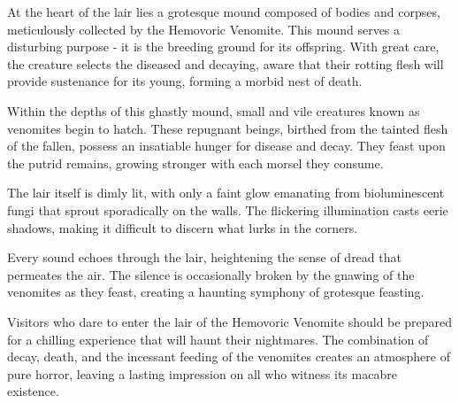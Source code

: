 At the heart of the lair lies a grotesque mound composed of bodies and corpses, meticulously collected by the Hemovoric Venomite. This mound serves a disturbing purpose - it is the breeding ground for its offspring. With great care, the creature selects the diseased and decaying, aware that their rotting flesh will provide sustenance for its young, forming a morbid nest of death.

Within the depths of this ghastly mound, small and vile creatures known as venomites begin to hatch. These repugnant beings, birthed from the tainted flesh of the fallen, possess an insatiable hunger for disease and decay. They feast upon the putrid remains, growing stronger with each morsel they consume.

The lair itself is dimly lit, with only a faint glow emanating from bioluminescent fungi that sprout sporadically on the walls. The flickering illumination casts eerie shadows, making it difficult to discern what lurks in the corners.

Every sound echoes through the lair, heightening the sense of dread that permeates the air. The silence is occasionally broken by the gnawing of the venomites as they feast, creating a haunting symphony of grotesque feasting.

Visitors who dare to enter the lair of the Hemovoric Venomite should be prepared for a chilling experience that will haunt their nightmares. The combination of decay, \linebreak\hspace*{1.75cm}death, and the incessant feeding of the \linebreak\hspace*{2.5cm}venomites creates an atmosphere of pure \linebreak\hspace*{4cm} horror, leaving a lasting \linebreak\hspace*{4.5cm} impression on all who witness \linebreak\hspace*{5cm} its macabre existence. \linebreak
